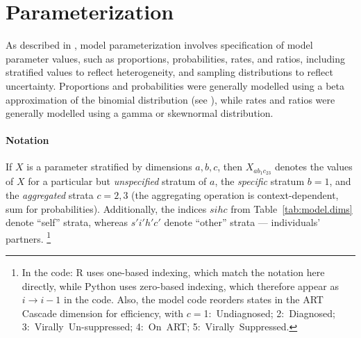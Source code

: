 \section{Parameterization}\label{model.par}
As described in , model parameterization involves
specification of model parameter values, such as proportions, probabilities, rates, and ratios,
including stratified values to reflect heterogeneity,
and sampling distributions to reflect uncertainty.
Proportions and probabilities were generally modelled using
a beta approximation of the binomial distribution (see ),
while rates and ratios were generally modelled using a gamma or skewnormal distribution.
\paragraph{Notation}
If $X$ is a parameter stratified by dimensions $a,b,c$,
then $X_{ab_{1}c_{23}}$ denotes the values of $X$ for
a particular but \emph{unspecified} stratum of $a$,
the \emph{specific} stratum $b = 1$,
and the \emph{aggregated} strata $c = 2,3$
(the aggregating operation is context-dependent, \eg sum for probabilities).
Additionally, the indices $sihc$ from Table~\ref{tab:model.dims} denote ``self'' strata,
whereas $s'i'h'c'$ denote ``other'' strata --- \ie individuals' partners.%
\footnote{\label{foot:code.note}%
  In the code: R uses one-based indexing, which match the notation here directly,
  while Python uses zero-based indexing, which therefore appear as $i \rightarrow i-1$ in the code.
  Also, the model code reorders states in the ART Cascade dimension for efficiency,
  with $c={}$1:~Undiagnosed; 2:~Diagnosed; 3:~Virally~Un-suppressed; 4:~On~ART; 5:~Virally~Suppressed.}



